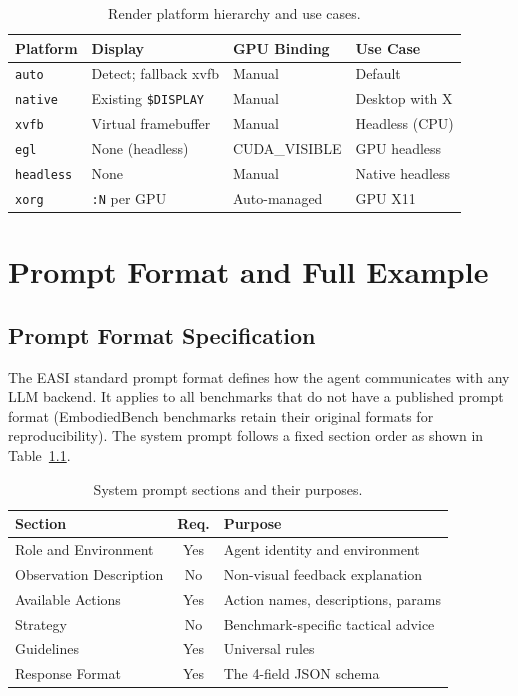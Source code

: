 \begin{table}[htbp]
\centering
\caption{Render platform hierarchy and use cases.}
\label{tab:render_platforms}
\small
\renewcommand{\arraystretch}{1.1}
\begin{tabular}{llll}
\toprule
\textbf{Platform} & \textbf{Display} & \textbf{GPU Binding} & \textbf{Use Case} \\
\midrule
\texttt{auto} & Detect; fallback xvfb & Manual & Default \\
\texttt{native} & Existing \texttt{\$DISPLAY} & Manual & Desktop with X \\
\texttt{xvfb} & Virtual framebuffer & Manual & Headless (CPU) \\
\texttt{egl} & None (headless) & CUDA\_VISIBLE & GPU headless \\
\texttt{headless} & None & Manual & Native headless \\
\texttt{xorg} & \texttt{:N} per GPU & Auto-managed & GPU X11 \\
\bottomrule
\end{tabular}
\end{table}


\chapter{Prompt Format and Full Example}
\label{sec:appendix_prompt}

\section{Prompt Format Specification}

The EASI standard prompt format defines how the agent communicates with any LLM backend. It applies to all benchmarks that do not have a published prompt format (EmbodiedBench benchmarks retain their original formats for reproducibility). The system prompt follows a fixed section order as shown in Table~\ref{tab:prompt_sections}.

\begin{table}[htbp]
\centering
\caption{System prompt sections and their purposes.}
\label{tab:prompt_sections}
\small
\renewcommand{\arraystretch}{1.1}
\begin{tabular}{lcp{5cm}}
\toprule
\textbf{Section} & \textbf{Req.} & \textbf{Purpose} \\
\midrule
Role and Environment & Yes & Agent identity and environment \\
Observation Description & No & Non-visual feedback explanation \\
Available Actions & Yes & Action names, descriptions, params \\
Strategy & No & Benchmark-specific tactical advice \\
Guidelines & Yes & Universal rules \\
Response Format & Yes & The 4-field JSON schema \\
\bottomrule
\end{tabular}
\end{table}


